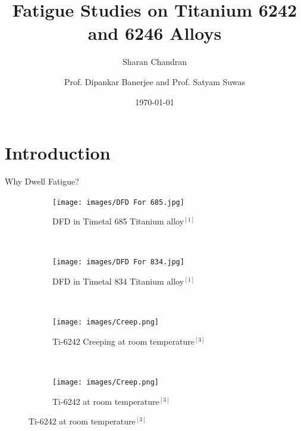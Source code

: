 \documentclass[10pt]{beamer}
\title{Fatigue Studies on Titanium 6242 and 6246 Alloys}
\subtitle{Sharan Chandran}
\date{\today}
\date{}
\author{Prof. Dipankar Banerjee and Prof. Satyam Suwas}
\institute{Indian Institute of Science}
\begin{document}

\maketitle

\section{Introduction}


{%
\begin{frame}[fragile]{Why Dwell Fatigue?}

\begin{figure}[H]
    \centering
    \begin{subfigure}{0.35\textwidth}
        \texttt{[image: images/DFD For 685.jpg]}
        \caption{DFD in Timetal 685 Titanium alloy$^{[1]}$}
        \end{subfigure}
    ~
    \begin{subfigure}{0.45\textwidth}
        \texttt{[image: images/DFD For 834.jpg]}
        \caption{DFD in Timetal 834 Titanium alloy$^{[1]}$}
    \end{subfigure}
    \\
    \begin{subfigure}{0.45\textwidth}
        \texttt{[image: images/Creep.png]}
        \caption{Ti-6242 Creeping at room temperature$^{[3]}$}
    \end{subfigure}
    ~
    \begin{subfigure}{0.45\textwidth}
        \texttt{[image: images/Creep.png]}
        \caption{Ti-6242 at room temperature$^{[3]}$}
    \end{subfigure}   
\end{figure}


\end{frame}
}
\end{document}
